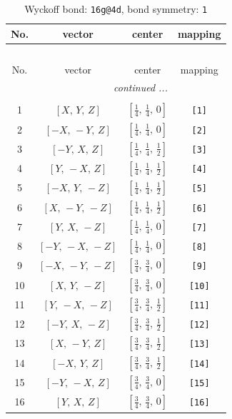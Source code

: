 \documentclass[fleqn,8pt]{jsarticle}
\begin{document}
\begin{longtable}{cccc}
\caption{Wyckoff bond: {\tt 16g@4d}, bond symmetry: {\tt 1}}
 \\
 \hline \hline
No. & vector & center & mapping \\ \hline \endfirsthead

\multicolumn{3}{l}{\tablename\ \thetable{}} \\
 \hline \hline
No. & vector & center & mapping \\ \hline \endhead

 \hline \hline
\multicolumn{3}{r}{\footnotesize\it continued ...} \\ \endfoot

 \hline \hline
\multicolumn{3}{r}{} \\ \endlastfoot

1 & $\left[ X,\, Y,\, Z \right]$ & $\left[ \frac{1}{4},\, \frac{1}{4},\, 0 \right]$ & {\tt [1]} \\ \hline
2 & $\left[ - X,\, - Y,\, Z \right]$ & $\left[ \frac{1}{4},\, \frac{1}{4},\, 0 \right]$ & {\tt [2]} \\ \hline
3 & $\left[ - Y,\, X,\, Z \right]$ & $\left[ \frac{1}{4},\, \frac{1}{4},\, \frac{1}{2} \right]$ & {\tt [3]} \\ \hline
4 & $\left[ Y,\, - X,\, Z \right]$ & $\left[ \frac{1}{4},\, \frac{1}{4},\, \frac{1}{2} \right]$ & {\tt [4]} \\ \hline
5 & $\left[ - X,\, Y,\, - Z \right]$ & $\left[ \frac{1}{4},\, \frac{1}{4},\, \frac{1}{2} \right]$ & {\tt [5]} \\ \hline
6 & $\left[ X,\, - Y,\, - Z \right]$ & $\left[ \frac{1}{4},\, \frac{1}{4},\, \frac{1}{2} \right]$ & {\tt [6]} \\ \hline
7 & $\left[ Y,\, X,\, - Z \right]$ & $\left[ \frac{1}{4},\, \frac{1}{4},\, 0 \right]$ & {\tt [7]} \\ \hline
8 & $\left[ - Y,\, - X,\, - Z \right]$ & $\left[ \frac{1}{4},\, \frac{1}{4},\, 0 \right]$ & {\tt [8]} \\ \hline
9 & $\left[ - X,\, - Y,\, - Z \right]$ & $\left[ \frac{3}{4},\, \frac{3}{4},\, 0 \right]$ & {\tt [9]} \\ \hline
10 & $\left[ X,\, Y,\, - Z \right]$ & $\left[ \frac{3}{4},\, \frac{3}{4},\, 0 \right]$ & {\tt [10]} \\ \hline
11 & $\left[ Y,\, - X,\, - Z \right]$ & $\left[ \frac{3}{4},\, \frac{3}{4},\, \frac{1}{2} \right]$ & {\tt [11]} \\ \hline
12 & $\left[ - Y,\, X,\, - Z \right]$ & $\left[ \frac{3}{4},\, \frac{3}{4},\, \frac{1}{2} \right]$ & {\tt [12]} \\ \hline
13 & $\left[ X,\, - Y,\, Z \right]$ & $\left[ \frac{3}{4},\, \frac{3}{4},\, \frac{1}{2} \right]$ & {\tt [13]} \\ \hline
14 & $\left[ - X,\, Y,\, Z \right]$ & $\left[ \frac{3}{4},\, \frac{3}{4},\, \frac{1}{2} \right]$ & {\tt [14]} \\ \hline
15 & $\left[ - Y,\, - X,\, Z \right]$ & $\left[ \frac{3}{4},\, \frac{3}{4},\, 0 \right]$ & {\tt [15]} \\ \hline
16 & $\left[ Y,\, X,\, Z \right]$ & $\left[ \frac{3}{4},\, \frac{3}{4},\, 0 \right]$ & {\tt [16]} \\
\end{longtable}
\end{document}
